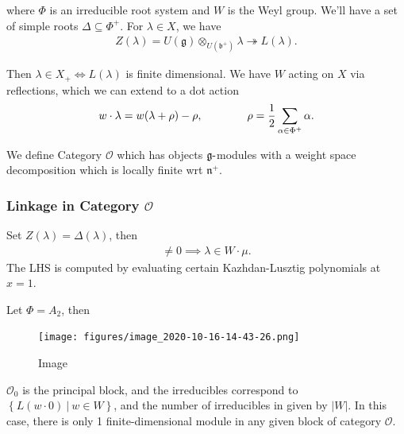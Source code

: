 where \(\Phi\) is an irreducible root system and \(W\) is the Weyl
group. We'll have a set of simple roots \(\Delta\subseteq \Phi^+\). For
\(\lambda\in X\), we have
\begin{align*}  
Z(\lambda) = U({\mathfrak{g}}) \otimes_{U({\mathfrak{b}}^+)} \lambda \twoheadrightarrow L(\lambda)
.\end{align*}

Then \(\lambda \in X_+ \iff L(\lambda)\) is finite dimensional. We have
\(W\) acting on \(X\) via reflections, which we can extend to a dot
action
\begin{align*}  
w\cdot \lambda = w(\lambda + \rho) - \rho, \hspace{4em} \rho = {1\over 2}\sum_{\alpha\in\Phi^+} \alpha
.\end{align*}

We define Category \({\mathcal{O}}\) which has objects
\({\mathfrak{g}}{\hbox{-}}\)modules with a weight space decomposition
which is locally finite wrt \({\mathfrak{n}}^+\).

\hypertarget{linkage-in-category-mathcalo}{%
\subsubsection{\texorpdfstring{Linkage in Category
\({\mathcal{O}}\)}{Linkage in Category \{\textbackslash mathcal\{O\}\}}}\label{linkage-in-category-mathcalo}}

Set \(Z(\lambda) = \Delta(\lambda)\), then
\begin{align*}  
[Z(\lambda) : L(\mu)] \neq 0 \implies \lambda \in W\cdot \mu
.\end{align*}
The LHS is computed by evaluating certain Kazhdan-Lusztig polynomials at
\(x=1\).

\begin{example}

Let \(\Phi= A_2\), then

\begin{figure}
\centering
\texttt{[image: figures/image\_2020-10-16-14-43-26.png]}
\caption{Image}
\end{figure}

\({\mathcal{O}}_0\) is the principal block, and the irreducibles
correspond to
\(\left\{{L(w\cdot 0) {~\mathrel{\Big|}~}w\in W}\right\}\), and the
number of irreducibles in given by \({\left\lvert {W} \right\rvert}\).
In this case, there is only 1 finite-dimensional module in any given
block of category \({\mathcal{O}}\).

\end{example}

